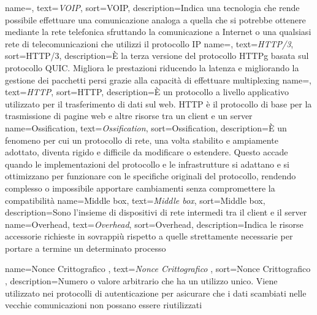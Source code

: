  {
    name=,
    text=\emph{VOIP},
    sort=VOIP,
    description={Indica una tecnologia che rende possibile effettuare una comunicazione analoga a quella che si potrebbe ottenere mediante la rete telefonica sfruttando la 
    comunicazione a Internet o una qualsiasi rete di telecomunicazioni che utilizzi il protocollo IP} 
}
 {
    name=,
    text=\emph{HTTP/3},
    sort=HTTP/3,
    description={È la terza versione del protocollo \gls{HTTPg} basata sul protocollo \gls{QUIC}. Migliora le prestazioni riducendo la latenza e migliorando la gestione dei pacchetti persi grazie alla capacità di effettuare \gls{multiplexing}}
}
 {
    name=,
    text=\emph{HTTP},
    sort=HTTP,
    description={È un protocollo a livello applicativo utilizzato per il trasferimento di dati sul web. HTTP è il protocollo di base per la trasmissione di pagine web e altre risorse tra un \gls{client} e un \gls{server}}
}
 {
    name=Ossification,
    text=\emph{Ossification},
    sort=Ossification,
    description={È un fenomeno per cui un protocollo di rete, una volta stabilito e ampiamente adottato, diventa rigido e difficile da modificare o estendere. Questo accade quando le implementazioni del protocollo e le infrastrutture si adattano e si ottimizzano per funzionare con le specifiche originali del protocollo, rendendo complesso o impossibile apportare cambiamenti senza compromettere la compatibilità}
}
 {
    name=Middle box,
    text=\emph{Middle box},
    sort=Middle box,
    description={Sono l'insieme di dispositivi di rete intermedi tra il \gls{client} e il \gls{server}}
}
 {
    name=Overhead,
    text=\emph{Overhead},
    sort=Overhead,
    description={Indica le risorse accessorie richieste in sovrappiù rispetto a quelle strettamente necessarie per portare a termine un determinato processo}
}

 {
    name=Nonce Crittografico ,
    text=\emph{Nonce Crittografico },
    sort=Nonce Crittografico ,
    description={Numero o valore arbitrario che ha un utilizzo unico. Viene utilizzato nei protocolli di autenticazione per asicurare che i dati scambiati nelle vecchie comunicazioni non possano essere riutilizzati}
}

